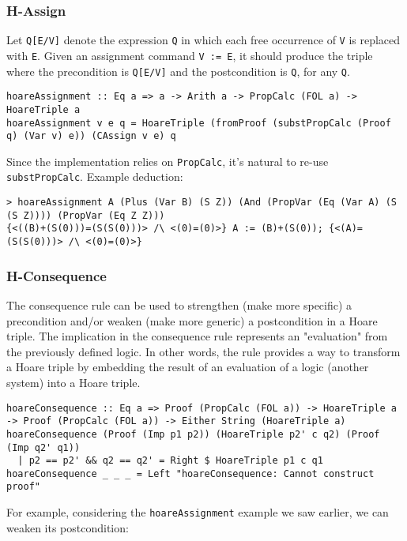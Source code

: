 \documentclass{article}
\begin{document}
\subsubsection{H-Assign}

Let \texttt{Q[E/V]} denote the expression \texttt{Q} in which each free occurrence of \texttt{V} is replaced with \texttt{E}. Given an assignment command \texttt{V := E}, it should produce the triple where the precondition is \texttt{Q[E/V]} and the postcondition is \texttt{Q}, for any \texttt{Q}.

\begin{lstlisting}
hoareAssignment :: Eq a => a -> Arith a -> PropCalc (FOL a) -> HoareTriple a
hoareAssignment v e q = HoareTriple (fromProof (substPropCalc (Proof q) (Var v) e)) (CAssign v e) q
\end{lstlisting}

Since the implementation relies on \texttt{PropCalc}, it's natural to re-use \texttt{substPropCalc}. Example deduction:

\begin{lstlisting}
> hoareAssignment A (Plus (Var B) (S Z)) (And (PropVar (Eq (Var A) (S (S Z)))) (PropVar (Eq Z Z)))
{<((B)+(S(0)))=(S(S(0)))> /\ <(0)=(0)>} A := (B)+(S(0)); {<(A)=(S(S(0)))> /\ <(0)=(0)>}
\end{lstlisting}

\subsubsection{H-Consequence}

The consequence rule can be used to strengthen (make more specific) a precondition and/or weaken (make more generic) a postcondition in a Hoare triple. The implication in the consequence rule represents an "evaluation" from the previously defined logic. In other words, the rule provides a way to transform a Hoare triple by embedding the result of an evaluation of a logic (another system) into a Hoare triple.

\begin{lstlisting}
hoareConsequence :: Eq a => Proof (PropCalc (FOL a)) -> HoareTriple a -> Proof (PropCalc (FOL a)) -> Either String (HoareTriple a)
hoareConsequence (Proof (Imp p1 p2)) (HoareTriple p2' c q2) (Proof (Imp q2' q1))
  | p2 == p2' && q2 == q2' = Right $ HoareTriple p1 c q1
hoareConsequence _ _ _ = Left "hoareConsequence: Cannot construct proof"
\end{lstlisting}

For example, considering the \texttt{hoareAssignment} example we saw earlier, we can weaken its postcondition:
\end{document}
